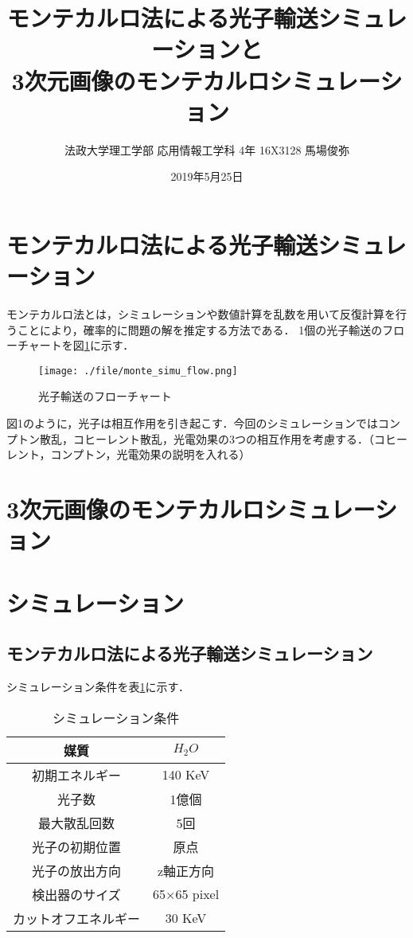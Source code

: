 \documentclass[dvipdfmx,autodetect-engine,twocolumn,10pt]{jsarticle}%
\title{モンテカルロ法による光子輸送シミュレーションと\\
3次元画像のモンテカルロシミュレーション}
\author{法政大学理工学部 応用情報工学科 4年 16X3128 馬場俊弥}
\date{2019年5月25日}
\begin{document}
\maketitle
\section{モンテカルロ法による光子輸送シミュレーション}
モンテカルロ法とは，シミュレーションや数値計算を乱数を用いて反復計算を行うことにより，確率的に問題の解を推定する方法である．
1個の光子輸送のフローチャートを図\ref{photon_flow}に示す．

\begin{figure}[h]
  \begin{center}
    \texttt{[image: ./file/monte\_simu\_flow.png]}\\
    \caption{光子輸送のフローチャート}
    \label{photon_flow}
  \end{center}
\end{figure}

図1のように，光子は相互作用を引き起こす．今回のシミュレーションではコンプトン散乱，コヒーレント散乱，光電効果の3つの相互作用を考慮する．（コヒーレント，コンプトン，光電効果の説明を入れる）

\section{3次元画像のモンテカルロシミュレーション}


\section{シミュレーション}
\subsection{モンテカルロ法による光子輸送シミュレーション}
シミュレーション条件を表\ref{simu_cond}に示す．
\begin{table}[htb]
  \begin{center}
    \caption{シミュレーション条件}
    \label{simu_cond}
    \begin{tabular}{|c|c|} \hline
      媒質 & $H_2O$ \\ \hline
      初期エネルギー & 140 KeV \\ \hline
      光子数 & 1億個 \\ \hline
      最大散乱回数 & 5回 \\ \hline
      光子の初期位置 & 原点 \\ \hline
      光子の放出方向 & z軸正方向 \\ \hline
      検出器のサイズ & 65×65 pixel \\ \hline
      カットオフエネルギー & 30 KeV \\ \hline
    \end{tabular}
  \end{center}
\end{table}
\end{document}
